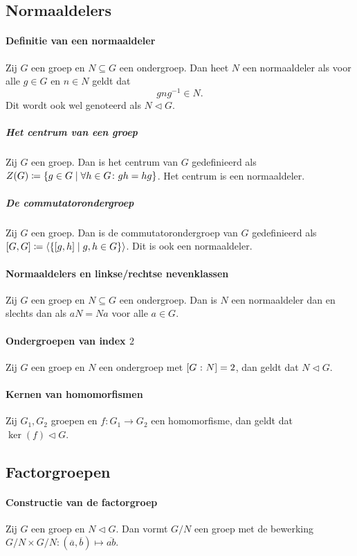\subsection{Normaaldelers}
\paragraph{Definitie van een normaaldeler} Zij \(G\) een groep en \(N\subseteq G\) een ondergroep. Dan heet \(N\) een normaaldeler als voor alle \(g\in G\) en \(n\in N\) geldt dat
\[
    gng^{-1}\in N.
\]
Dit wordt ook wel genoteerd als \(N\triangleleft G\).

\subparagraph{Het centrum van een groep} Zij \(G\) een groep. Dan is het centrum van \(G\) gedefinieerd als \(Z(G)\coloneqq\{g\in G\mid \forall h\in G\colon gh=hg\}\). Het centrum is een normaaldeler.

\subparagraph{De commutatorondergroep} Zij \(G\) een groep. Dan is de commutatorondergroep van \(G\) gedefinieerd als \([G,G]\coloneqq\left\langle\{[g,h]\mid g,h\in G\}\right\rangle\). Dit is ook een normaaldeler.

\paragraph{Normaaldelers en linkse/rechtse nevenklassen} Zij \(G\) een groep en \(N\subseteq G\) een ondergroep. Dan is \(N\) een normaaldeler dan en slechts dan als \(aN=Na\) voor alle \(a\in G\).

\paragraph{Ondergroepen van index \(2\)} Zij \(G\) een groep en \(N\) een ondergroep met \(\left[G\>\colon N\right]=2\), dan geldt dat \(N\triangleleft G\).

\paragraph{Kernen van homomorfismen} Zij \(G_{1},G_{2}\) groepen en \(f\colon G_{1}\to G_{2}\) een homomorfisme, dan geldt dat \(\ker(f)\triangleleft G\).

\subsection{Factorgroepen}
\paragraph{Constructie van de factorgroep} Zij \(G\) een groep en \(N\triangleleft G\). Dan vormt \(G/N\) een groep met de bewerking \(G/N\times G/N\colon (\overline{a},\overline{b})\mapsto \overline{ab}\).

